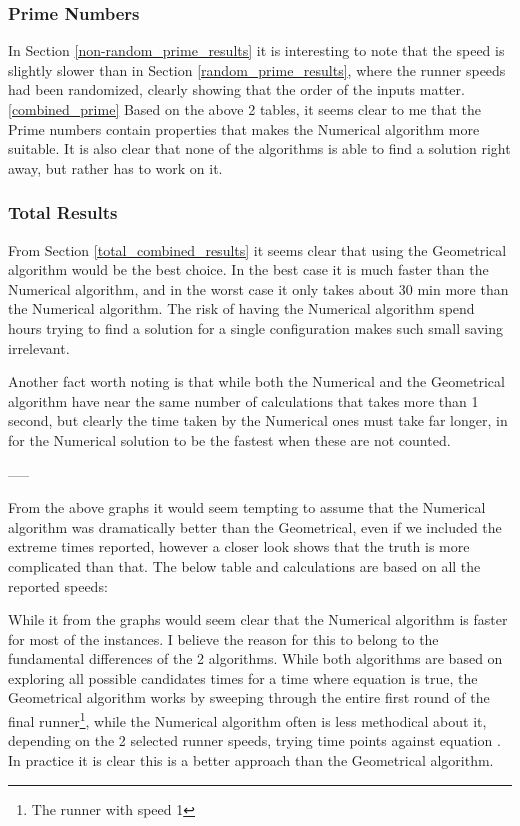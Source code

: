\subsubsection{Prime Numbers}

In Section \ref{non-random_prime_results} it is interesting to note that the speed is slightly slower than in Section \ref{random_prime_results}, where the runner speeds had been randomized, clearly showing that the order of the inputs matter.\\

\ref{combined_prime}
Based on the above 2 tables, it seems clear to me that the Prime numbers contain properties that makes the Numerical algorithm more suitable. It is also clear that none of the algorithms is able to find a solution right away, but rather has to work on it. 


\subsubsection{Total Results}
From Section \ref{total_combined_results} it seems clear that using the Geometrical algorithm would be the best choice. In the best case it is much faster than the Numerical algorithm, and in the worst case it only takes about 30 min more than the Numerical algorithm. The risk of having the Numerical algorithm spend hours trying to find a solution for a single configuration makes such small saving irrelevant.  

Another fact worth noting is that while both the Numerical and the Geometrical algorithm have near the same number of calculations that takes more than 1 second, but clearly the time taken by the Numerical ones must take far longer, in for the Numerical solution to be the fastest when these are not counted.

-----


From the above graphs it would seem tempting to assume that the Numerical algorithm was dramatically better than the Geometrical, even if we included the extreme times reported, however a closer look shows that the truth is more complicated than that. The below table and calculations are based on all the reported speeds:

%

While it from the graphs would seem clear that the Numerical algorithm is faster for most of the instances. 
I believe the reason for this to belong to the fundamental differences of the 2 algorithms. While both algorithms are based on exploring all possible candidates times for a time where equation  is true, the Geometrical algorithm works by sweeping through the entire first round of the final runner\footnote{The runner with speed 1}, while the Numerical algorithm often is less methodical about it, depending on the 2 selected runner speeds, trying time points against equation . In practice it is clear this is a better approach than the Geometrical algorithm.
 
